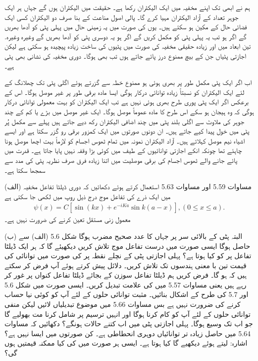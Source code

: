  ہم نے ابھی تک اپنے مخفیہ میں ایک الیکٹران رکھا ہے۔ حقیقت میں  الیکٹران ہوں گے جہاں ہر ایک جوہر  تعداد کے آزاد الیکٹران مہیا  کرے گا۔ پالی اصول مناعت کے بنا صرف دو الیکٹران کسی ایک فضائی حال کے مکین ہو سکتے ہیں۔ یوں   کی صورت میں یہ زمینی حال میں پہلی پٹی کو آدھا   بھریں گے اگر   ہو تب یہ پہلی پٹی کو مکمل کریں گے اگر  ہو یہ دوسری پٹی کو آدھا بھریں گے وغیرہ وغیرہ. تین ابعاد میں اور زیادہ حقیقی مخفیہ کی صورت میں پٹیوں کی ساخت زیادہ پیچیدہ ہو سکتی ہے لیکن اجازتی پٹیاں جن کے بیچ ممنوع درز پائے جاتے ہوں تب بھی ہوگا۔ دوری مخفیہ کی نشانی بھی پٹی ہے۔
 
 اب اگر ایک پٹی مکمل طور پر بھری ہوئی ہو ممنوع خطہ سے گزرتے ہوئے اگلی پٹی تک چھلانگ کے لئے ایک الیکٹران کو نسبتاً زیادہ توانائی درکار ہوگی ایسا مادہ برقی طور پر غیر موصل ہوگا۔ اس کے برعکس اگر ایک پٹی پوری طرح بھری ہوئی نہیں ہے تب ایک الیکٹران کو بہت معمولی توانائی درکار ہوگی کہ وہ ہیجان ہو سکے  اس طرح کا مادہ عموماً موصل ہوگا۔ ایک غیر موصل میں بڑے یا کم  کے چند جوہر کی ملاوٹ سے اگلی بلند پٹی میں چند اضافی الیکٹران رکھ دیے جاتے ہیں پہلے سے مکمل پُر پٹی میں خول پیدا کیے جاتے ہیں۔ ان دونوں صورتوں میں ایک کمزور برقی رو گزر سکتا ہے اور ایسے اشیاء نیم موصل کہلاتے ہیں۔ آزاد الیکٹران نمونہ میں تمام ٹھوس اجسام کو لازماً بہت اچھا موصل ہونا چاہئے تھا چونکہ انکے اجازتی توانائیوں کے طیف میں کوئی بڑا وقفہ نہیں پایا جاتا ہے۔ قدرت میں پائے جانے والے ٹھوس اجسام کی برقی موصلیت میں اتنا زیادہ فرق صرف نظریہ پٹی کی مدد سے سمجھا سکتا ہے۔  


(الف) مساوات \num{5.59} اور مساوات \num{5.63} استعمال کرتے ہوئے دکھائیں کہ دوری ڈیلٹا تفاعل مخفیہ میں ایک ذرے کی تفاعل موج درج ذیل روپ میں لکھی جا سکتی ہے 
\begin{align*}
	\psi(x) = C[\sin(kx)+e^{-iKa}\sin k(a-x)], (0\leq x\leq a).
\end{align*} 
معمول زنی مستقل  تعین کرنے کی ضرورت نہیں ہے۔

(ب)  البتہ پٹی کے بالائی سر پر جہاں   کا عدد صحیح مضرب ہوگا شکل \num{5.6} (الف) سے  حاصل ہوگا ایسی صورت میں درست تفاعل موج تلاش کریں دیکھیئے گا کہ ہر ایک ڈیلٹا تفاعل پر  کو کیا ہوتا ہے؟
پہلی اجازتی پٹی کے نچلے نقطہ پر  کی صورت میں توانائی کی قیمت تین با معنی ہندسوں تک تلاش کریں۔ دلائل پیش کرتے ہوئے آپ فرض کر سکتے ہیں کہ ہو گا۔
فرض کریں ہم ڈیلٹا تفاعل سوزن کے بجائے ڈیلٹا تفاعل کنواں پر غور کر رہے ہیں یعنی مساوات \num{5.57} میں  کی علامت تبدیل کریں۔ ایسی صورت میں شکل \num{5.6} اور \num{5.7} کی طرح کے اشکال بنائیں۔ مثبت توانائی حلوں کے لئے آپ کو کوئی نیا حساب کرنے کی ضرورت نہیں ہے بس مساوات \num{5.66} میں موضوع تبدیلیاں لائیں لیکن منفی توانائی حلوں کے لئے آپ کو کام کرنا ہوگا اور انہیں ترسیم پر شامل کرنا مت بھولیے گا جو اب  تک وسیع ہوگا۔ پہلی اجازتی پٹی میں اب کتنے حالات ہونگے؟
دکھائیں کہ مساوات \num{5.64} میں حاصل زیادہ تر توانائیاں دوہری انحطاطی ہے۔ کن صورتوں میں ایسا نہیں ہے؟ اشارہ:  لیتے ہوئے دیکھیے گا کیا ہوتا ہے۔ ایسی ہر صورت میں  کی کیا  ممکنہ قیمتیں ہوں گی؟

